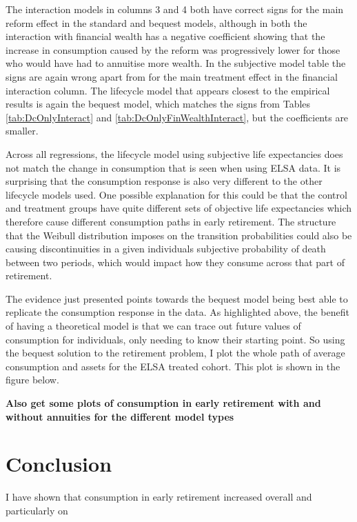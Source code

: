 \documentclass[12pt]{article}
\begin{document}
The interaction models in columns 3 and 4 both have correct signs for the main
reform effect in the standard and bequest models, although in both the
interaction with financial wealth has a negative coefficient showing that the
increase in consumption caused by the reform was progressively lower for those
who would have had to annuitise more wealth. In the subjective model table the
signs are again wrong apart from for the main treatment effect in the financial
interaction column. The lifecycle model that appears closest to the empirical
results is again the bequest model, which matches the signs from Tables
\ref{tab:DcOnlyInteract} and \ref{tab:DcOnlyFinWealthInteract}, but the
coefficients are smaller.

Across all regressions, the lifecycle model using subjective life expectancies
does not match the change in consumption that is seen when using ELSA data. It
is surprising that the consumption response is also very different to the other
lifecycle models used. One possible explanation for this could be that the
control and treatment groups have quite different sets of objective life
expectancies which therefore cause different consumption paths in early
retirement. The structure that the Weibull distribution imposes on the
transition probabilities could also be causing discontinuities in a given
individuals subjective probability of death between two periods, which would
impact how they consume across that part of retirement.

The evidence just presented points towards the bequest model being best able to
replicate the consumption response in the data. As highlighted above, the
benefit of having a theoretical model is that we can trace out future values of
consumption for individuals, only needing to know their starting point. So using
the bequest solution to the retirement problem, I plot the whole path of average
consumption and assets for the ELSA treated cohort. This plot is shown in the
figure below.



\textbf{Also get some plots of consumption in early retirement with and without
    annuities for the different model types}


\section{Conclusion}

I have shown that consumption in early retirement increased overall and
particularly on
\end{document}
